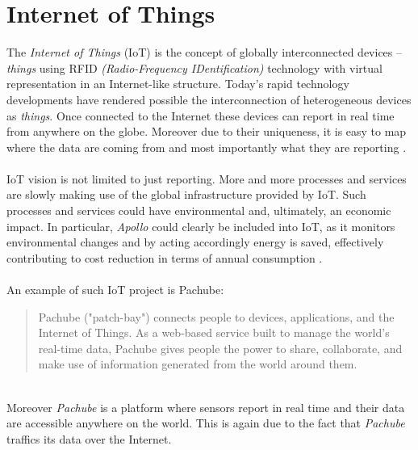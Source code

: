\documentclass[12pt,a4paper,draft]{report}
\begin{document}
\section{Internet of Things}
The \textit{Internet of Things} (IoT) is the concept of globally interconnected devices -- \textit{things} using RFID \textit{(Radio-Frequency IDentification)} technology with virtual representation in an Internet-like structure.
Today's rapid technology developments have rendered possible the interconnection of heterogeneous devices as \textit{things}.
Once connected to the Internet these devices can report in real time from anywhere on the globe.
Moreover due to their uniqueness, it is easy to map where the data are coming from and most importantly what they are reporting \cite{website:iot}.\\
\ \\
IoT vision is not limited to just reporting.
More and more processes and services are slowly making use of the global infrastructure provided by IoT.
Such processes and services could have environmental and, ultimately, an economic impact. 
In particular, \emph{Apollo} could clearly be included into IoT, as it monitors environmental changes and by acting accordingly energy is saved, effectively contributing to cost reduction in terms of annual consumption \cite{iotconference}.\\
\ \\
An example of such IoT project is Pachube:
\begin{quote} 
    Pachube ("patch-bay") connects people to devices, applications, and the Internet of Things. As a web-based service built to manage the world's real-time data, Pachube gives people the power to share, collaborate, and make use of information generated from the world around them. \cite{website:pachube}
\end{quote}
\ \\
Moreover \textit{Pachube} is a platform where sensors report in real time and their data are accessible anywhere on the world. 
This is again due to the fact that \textit{Pachube} traffics its data over the Internet.
%
\end{document}
